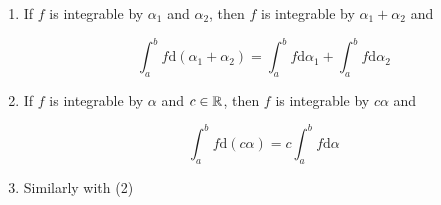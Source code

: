 \begin{thm}
\begin{enumerate}
        \item If $f$ is integrable by $\alpha_1$ and $\alpha_2$, then $f$ is integrable by $\alpha_1 + \alpha_2$ and

        \[
            \int_a^b f \mathrm{d} (\alpha_1 + \alpha_2) = \int_a^b f \mathrm{d} \alpha_1 + \int_a^b f \mathrm{d}  \alpha_2
        \]


        \item If $f$ is integrable by $\alpha$ and $c \in \mathbb{R}$, then $f$ is integrable by $c \alpha$ and

        \[
            \int_a^b f \mathrm{d} (c \alpha) = c\int_a^b f \mathrm{d}  \alpha
        \]

        \item Similarly with (2)
    \end{enumerate}
\end{thm}

